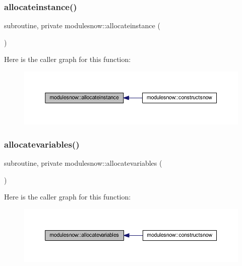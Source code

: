 \subsubsection{\texorpdfstring{allocateinstance()}{allocateinstance()}}
{\footnotesize\ttfamily subroutine, private modulesnow\+::allocateinstance (\begin{DoxyParamCaption}{ }\end{DoxyParamCaption})\hspace{0.3cm}{\ttfamily [private]}}

Here is the caller graph for this function\+:\nopagebreak
\begin{figure}[H]
\begin{center}
\leavevmode
\includegraphics[width=350pt]{namespacemodulesnow_a752062220e47eb96c5b9ecdc75609c34_icgraph}
\end{center}
\end{figure}
\mbox{\label{namespacemodulesnow_a82db750ad87b4aa5ce786f1d63a4f901}} 
\subsubsection{\texorpdfstring{allocatevariables()}{allocatevariables()}}
{\footnotesize\ttfamily subroutine, private modulesnow\+::allocatevariables (\begin{DoxyParamCaption}{ }\end{DoxyParamCaption})\hspace{0.3cm}{\ttfamily [private]}}

Here is the caller graph for this function\+:\nopagebreak
\begin{figure}[H]
\begin{center}
\leavevmode
\includegraphics[width=350pt]{namespacemodulesnow_a82db750ad87b4aa5ce786f1d63a4f901_icgraph}
\end{center}
\end{figure}
\mbox{\label{namespacemodulesnow_aab9a2dba663d0f96350797dd7fbd0923}} 
